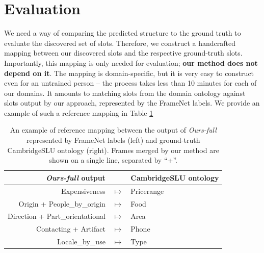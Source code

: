 \section{Evaluation}
We need a way of comparing the predicted structure to the ground truth to evaluate the discovered set of slots.
Therefore, we construct a handcrafted mapping between our discovered slots and the respective ground-truth slots.
Importantly, this mapping is only needed for evaluation; \textbf{our method does not depend on it}.
The mapping is domain-specific, but it is very easy to construct even for an untrained person -- the process takes less than 10 minutes for each of our domains.
It amounts to matching slots from the domain ontology against slots output by our approach, represented by the FrameNet labels.
We provide an example of such a reference mapping in Table \ref{03:ref_mapping}
\label{sec:app-ref-mapping}

\begin{table}[tp]
    \centering
    \small
    \begin{tabular}{rcl}
    \textbf{\emph{Ours-full} output} & & \textbf{CambridgeSLU ontology}\\\hline
     Expensiveness & $ \mapsto$ & Pricerange\\
     Origin + People\_by\_origin & $ \mapsto$ & Food\\
     Direction + Part\_orientational & $ \mapsto$ & Area\\
     Contacting + Artifact & $ \mapsto$ & Phone\\
     Locale\_by\_use & $ \mapsto$ & Type \\
     

    \end{tabular}
    \caption{An example of reference mapping between the output of \emph{Ours-full} represented by FrameNet labels (left) and ground-truth CambridgeSLU ontology (right).
    Frames merged by our method are shown on a single line, separated by “+”.
    }
    \label{03:ref_mapping}
\end{table}

